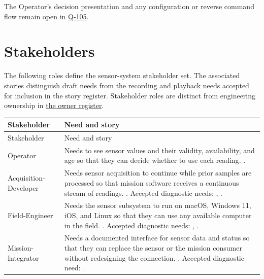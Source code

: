 The Operator's decision presentation and any configuration or reverse command
flow remain open in \hyperref[Question:Q-105]{Q-105}.

\section{Stakeholders}
\label{Section:MeasurementStakeholders}
The following roles define the sensor-system stakeholder set. The associated stories distinguish draft needs from the recording and playback needs accepted for inclusion in the story register. Stakeholder roles are distinct from engineering ownership in \hyperref[Table:ProjectOwners]{the owner register}.

\small
\begin{tabularx}{\linewidth}{L{3.6cm}Y}
\caption{Measurement Stakeholder Needs\label{Table:StakeholderNeeds}}\\
\toprule
Stakeholder & Need and story\\\midrule
\endfirsthead
\toprule
Stakeholder & Need and story\\\midrule
\endhead
\bottomrule
\endlastfoot
{}\label{Stakeholder:Operator}Operator & Needs to see sensor values and their validity, availability, and age so that they can decide whether to use each reading. .\\
\label{Stakeholder:Acquisition-Developer}Acquisition-Developer & Needs sensor acquisition to continue while prior samples are processed so that mission software receives a continuous stream of readings. . Accepted diagnostic needs: , .\\
\label{Stakeholder:Field-Engineer}Field-Engineer & Needs the sensor subsystem to run on macOS, Windows 11, iOS, and Linux so that they can use any available computer in the field. . Accepted diagnostic needs: , .\\
\label{Stakeholder:Mission-Integrator}Mission-Integrator & Needs a documented interface for sensor data and status so that they can replace the sensor or the mission consumer without redesigning the connection. . Accepted diagnostic need: .\\
\end{tabularx}
\normalsize

